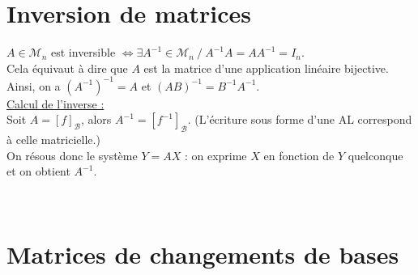 \section{Inversion de matrices}
    
    $A \in \mathcal{M}_n$ est inversible $\iff \exists A^{-1} \in \mathcal{M}_n\ /\ A^{-1}A = AA^{-1} = I_n$.\\
    Cela équivaut à dire que $A$ est la matrice d'une application linéaire bijective.\\
    
    Ainsi, on a $(A^{-1})^{-1} = A$ et $(AB)^{-1} = B^{-1} A^{-1}$.\\
    
    \underline{Calcul de l'inverse :} \vspace{4pt}\\
    Soit $A = [f]_\mathcal{B}$, alors $A^{-1} = [f^{-1}]_\mathcal{B}$.
    (L'écriture sous forme d'une AL correspond à celle matricielle.) \vspace{2pt}\\
    On résous donc le système $Y = AX$ : on exprime $X$ en fonction de $Y$ quelconque et on obtient $A^{-1}$.
    
    \vspace{1pt}\\


\section{Matrices de changements de bases}
    

